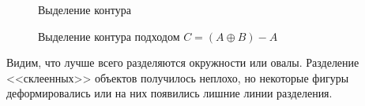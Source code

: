 \documentclass[a4paper, 12pt]{article}
\begin{document}
    \begin{figure}[H]
        \centering
        \captionsetup{skip=0pt}
        \caption{Выделение контура}
        \label{fig:binnc}
    \end{figure}
    \begin{figure}[H]
        \centering
        \captionsetup{skip=0pt}
        \caption{Выделение контура подходом $C=(A\oplus B)-A$}
        \label{fig:binnc2}
    \end{figure}
    Видим, что лучше всего разделяются окружности или овалы. Разделение <<склеенных>> объектов
    получилось неплохо, но некоторые фигуры деформировались или на них появились лишние линии
    разделения.
\end{document}
